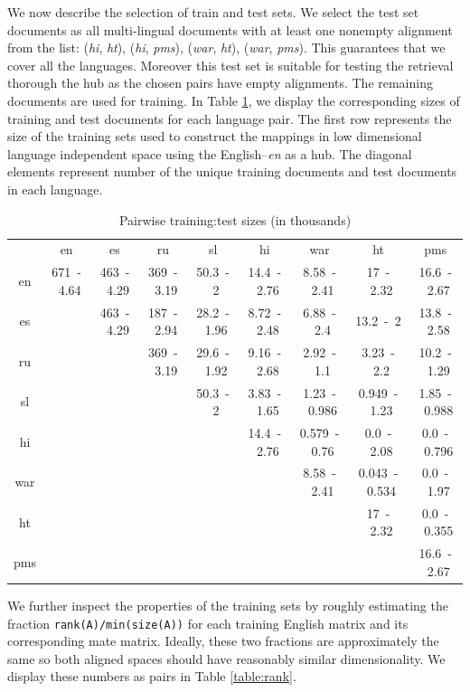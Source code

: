 \documentclass[twoside,11pt]{article}
\begin{document}
{We now describe the selection of train and test sets. We select the test set documents as all multi-lingual documents with at least one nonempty alignment from the list: (\emph{hi}, \emph{ht}), (\emph{hi}, \emph{pms}), (\emph{war}, \emph{ht}), (\emph{war}, \emph{pms}). This guarantees that we cover all the languages. Moreover this test set is suitable for testing the retrieval thorough the hub as the chosen pairs have empty alignments. The remaining documents are used for training. In Table \ref{table:train_test}, we display the corresponding sizes of training and test documents for each language pair. The first row represents the size of the training sets used to construct the mappings in low dimensional language independent space using the English--\emph{en} as a hub. The diagonal elements represent number of the unique training documents and test documents in each language.

{
\renewcommand\tabcolsep{3pt}
\begin{table}[h!]
\caption{Pairwise training:test sizes (in thousands)}
\label{table:train_test}
{
\small
\begin{tabular}{c|c|c|c|c|c|c|c|c|}
&	en&	es&	ru&	sl&	hi&	war&	ht&	pms\\\cline{1-9}
en&	671~-~4.64&	463~-~4.29&	369~-~3.19&	50.3~-~2&	14.4~-~2.76&	8.58~-~2.41&	 17~-~2.32&	16.6~-~2.67\\
\cline{2-9}
es&	\multicolumn{1}{c|}{}	&	463~-~4.29&	187~-~2.94&	28.2~-~1.96&	8.72~-~2.48&	 6.88~-~2.4&	13.2~-~2&	 13.8~-~2.58\\
\cline{3-9}
ru&	\multicolumn{2}{c|}{}	&	369~-~3.19&	29.6~-~1.92&	9.16~-~2.68&	2.92~-~1.1&	 3.23~-~2.2&	10.2~-~1.29\\
\cline{4-9}
sl&	\multicolumn{3}{c|}{}	&	50.3~-~2&	3.83~-~1.65&	1.23~-~0.986&	0.949~-~1.23&	 1.85~-~0.988\\
\cline{5-9}
hi&	\multicolumn{4}{c|}{}	&	14.4~-~2.76&	0.579~-~0.76&	0.0~-~2.08&	0.0~-~0.796\\
\cline{6-9}
war&	\multicolumn{5}{c|}{}	&	8.58~-~2.41&	0.043~-~0.534&	0.0~-~1.97\\
\cline{7-9}
ht&	\multicolumn{6}{c|}{}	&	17~-~2.32&	0.0~-~0.355\\
\cline{8-9}
pms&	\multicolumn{7}{c|}{}	&	16.6~-~2.67\\
\cline{9-9}
\end{tabular}
}
\end{table}
}

We further inspect the properties of the training sets by roughly estimating the fraction \texttt{rank(A)/min(size(A))} for each training English matrix and its corresponding mate matrix. Ideally, these two fractions are approximately the same so  both aligned spaces should have reasonably similar dimensionality. We display these numbers as pairs in Table \ref{table:rank}.

}
\end{document}
